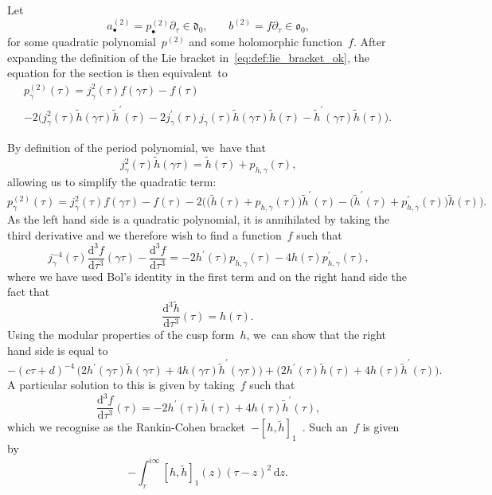 \documentclass[JEP,XML,SOM,Unicode,published]{cedram}
\let\oldbullet\bullet
\renewcommand{\bullet}{{\scriptscriptstyle\oldbullet}}
\theoremstyle{plain}
\theoremstyle{definition}
\newcommand{\tx}{\text}
\newcommand{\frakd}{\ensuremath{\mathfrak{d}}}
\newcommand{\frako}{\ensuremath{\mathfrak{o}}}
\newcommand{\rmd}{\ensuremath{\mathrm{d}}}
\let\ga\gamma
\newcommand{\dz}{\rmd z}
\newcommand{\dtau}{\rmd \tau}
\begin{document}
Let\vspace*{-3pt}
\begin{equation*}
a^{(2)}_\bullet= p^{(2)}_\bullet \partial_\tau \in \frakd_0
\tx{,}\qquad
b^{(2)}= f\partial_\tau\in \frako_0\tx{,}
\end{equation*}
for some quadratic polynomial~$p^{(2)}$ and some holomorphic function~$f$. After expanding the definition of the Lie bracket in~\eqref{eq:def:lie_bracket_ok}, the equation for the section is then equivalent~to\vspace*{-5pt}
\begin{multline*}
p^{(2)}_\ga(\tau) = j_\ga^2(\tau)f(\ga\tau) - f(\tau)\\[-5pt]
- 2\bigl(j_\ga^2(\tau)\tilde{h}(\ga\tau)\tilde{h}^\prime(\tau) - 2j_\ga^\prime(\tau)j_\ga(\tau)\tilde{h}(\ga\tau)\tilde{h}(\tau) - \tilde{h}^\prime(\ga\tau)\tilde{h}(\tau)\bigr)
\tx{.}
\end{multline*}

By definition of the period polynomial, we~have that
\begin{equation*}j_\ga^2(\tau)\tilde{h}(\ga\tau) = \tilde{h}(\tau) + p_{h,\ga}(\tau)\tx{,}\end{equation*}
allowing us to simplify the quadratic term:
\begin{equation}\label{eq:quadratic-log-term}
p^{(2)}_\ga(\tau)
=
j_\ga^2(\tau)f(\ga\tau) - f(\tau)
- 2\bigl(
\bigl(\tilde{h}(\tau)+p_{h,\ga}(\tau) \bigr)\tilde{h}^\prime(\tau)
- \bigl(\tilde{h}^\prime(\tau) + p_{h,\ga}^\prime(\tau)\bigr) \tilde{h}(\tau)
\bigr)
\tx{.}
\end{equation}
As the left hand side is a quadratic polynomial, it is annihilated by taking the third derivative and we therefore wish to find a function~$f$ such that
\begin{equation*}
j_\ga^{-4}(\tau) \frac{\rmd^3f}{\dtau^3}(\ga\tau) - \frac{\rmd^3f}{\dtau^3}
=
-2h^\prime(\tau)p_{h,\ga}(\tau) - 4h(\tau)p^\prime_{h,\ga}(\tau)
\tx{,}
\end{equation*}
where we have used Bol's identity in the first term and on the right hand side the fact that
\begin{equation*}
\frac{\rmd^3\tilde{h}}{\dtau^3}(\tau) = h(\tau)
\tx{.}
\end{equation*}
Using the modular properties of the cusp form~$h$, we~can show that the right hand side is equal to
\begin{equation*}
-(c\tau+d)^{-4}\,
\bigl(2h^\prime(\gamma\tau)\tilde{h}(\gamma\tau) + 4h(\gamma\tau)\tilde{h}^\prime(\gamma\tau) \bigr)
+ \bigl(2h^\prime(\tau)\tilde{h}(\tau) + 4 h(\tau)\tilde{h}^\prime(\tau) \bigr)
\tx{.}
\end{equation*}
A particular solution to this is given by taking~$f$ such that
\begin{equation*}
\frac{\rmd^3f}{\dtau^3}(\tau)
=
-2h^\prime(\tau)\tilde{h}(\tau) + 4h(\tau)\tilde{h}^\prime(\tau)
\tx{,}
\end{equation*}
which we recognise as the Rankin-Cohen bracket~$-[h,\tilde{h}]_1$~\cite{bruinier-van-der-geer-harder-zagier-2008}. Such an~$f$ is given by
\begin{equation*}-\int_\tau^{i\infty} [h,\tilde{h}]_1(z)(\tau-z)^2 \,\dz\tx{.}\end{equation*}
\end{document}
